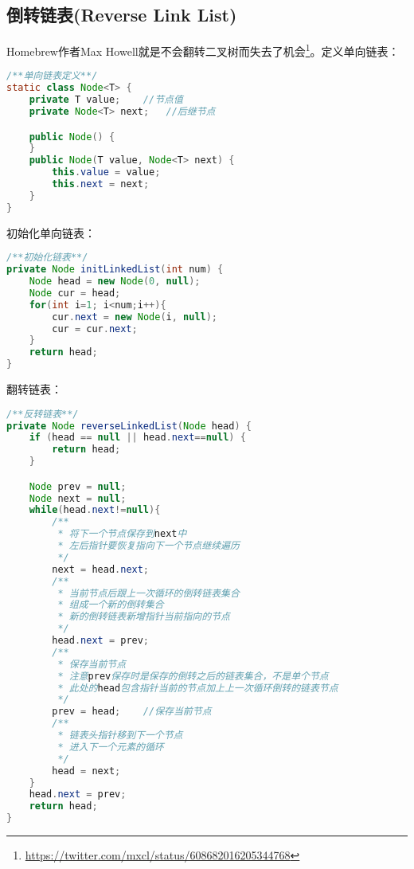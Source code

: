 \documentclass[../../../interview-questions.tex]{subfiles}
\begin{document}
\subsection{倒转链表(Reverse Link List)}

Homebrew作者Max Howell就是不会翻转二叉树而失去了机会\footnote{\url{https://twitter.com/mxcl/status/608682016205344768}}。定义单向链表：


\begin{lstlisting}[language=Java]
/**单向链表定义**/
static class Node<T> {
    private T value;    //节点值
    private Node<T> next;   //后继节点

    public Node() {
    }
    public Node(T value, Node<T> next) {
        this.value = value;
        this.next = next;
    }
}
\end{lstlisting}

初始化单向链表：

\begin{lstlisting}[language=Java]
/**初始化链表**/
private Node initLinkedList(int num) {
    Node head = new Node(0, null);
    Node cur = head;
    for(int i=1; i<num;i++){
        cur.next = new Node(i, null);
        cur = cur.next;
    }
    return head;
}
\end{lstlisting}

翻转链表：

\begin{lstlisting}[language=Java]
/**反转链表**/
private Node reverseLinkedList(Node head) {
    if (head == null || head.next==null) {
        return head;
    }

    Node prev = null;
    Node next = null;
    while(head.next!=null){
        /**
         * 将下一个节点保存到next中
         * 左后指针要恢复指向下一个节点继续遍历
         */
        next = head.next;
        /**
         * 当前节点后跟上一次循环的倒转链表集合
         * 组成一个新的倒转集合
         * 新的倒转链表新增指针当前指向的节点
         */
        head.next = prev;
        /**
         * 保存当前节点
         * 注意prev保存时是保存的倒转之后的链表集合，不是单个节点
         * 此处的head包含指针当前的节点加上上一次循环倒转的链表节点
         */
        prev = head;    //保存当前节点
        /**
         * 链表头指针移到下一个节点
         * 进入下一个元素的循环
         */
        head = next;
    }
    head.next = prev;
    return head;
}
\end{lstlisting}
\end{document}

